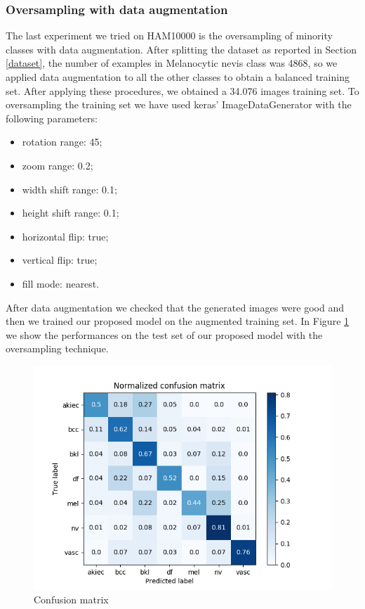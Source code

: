 	\subsubsection{Oversampling with data augmentation}
	
		The last experiment we tried on HAM10000 is the oversampling of minority classes with data augmentation. After splitting the dataset as reported in Section \ref{dataset}, the number of examples in Melanocytic nevis class was 4868, so we applied data augmentation to all the other classes to obtain a balanced training set. After applying these procedures, we obtained a 34.076 images training set.
		To oversampling the training set we have used keras' ImageDataGenerator with the following parameters:
		\begin{itemize}
			\item rotation range: 45; 
			\item zoom range: 0.2; 
			\item width shift range: 0.1;
			\item height shift range: 0.1;
			\item horizontal flip: true; 
			\item vertical flip: true;
			\item fill mode: nearest.
		\end{itemize}
		
		After data augmentation we checked that the generated images were good and then we trained our proposed model on the augmented training set.
		In Figure \ref{fig:third-matrix} we show the performances on the test set of our proposed model with the oversampling technique.
		
		\begin{figure}[H]
			\centering
			\includegraphics[width=15cm]{images/thirdMatrix.png}
			\caption{Confusion matrix}
			\label{fig:third-matrix}
		\end{figure}
		
